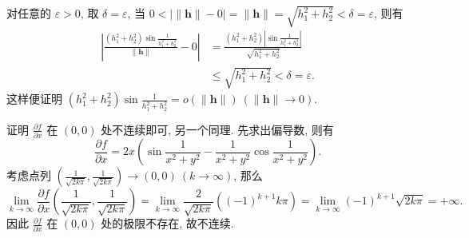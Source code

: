 \documentclass[a4paper, 11pt]{ctexart}
\begin{document}
\begin{enumerate}
        对任意的 $\varepsilon > 0$, 取 $\delta = \varepsilon$, 当 $0 < |\|\boldsymbol{h}\| - 0| = \|\boldsymbol{h}\| = \sqrt{h_1^2 + h_2^2} < \delta = \varepsilon$, 则有
        \begin{align*}
            \left| \frac{(h_1^2 + h_2^2)\sin\frac{1}{h_1^2 + h_2^2}}{\|\boldsymbol{h}\|} - 0 \right| &= \frac{(h_1^2 + h_2^2)|\sin\frac{1}{h_1^2 + h_2^2}|}{\sqrt{h_1^2 + h_2^2}} \\
            &\leqslant \sqrt{h_1^2 + h_2^2} < \delta = \varepsilon.    
        \end{align*}
        这样便证明 $(h_1^2 + h_2^2)\sin\frac{1}{h_1^2 + h_2^2} = o(\|\boldsymbol{h}\|)\ (\|\boldsymbol{h}\|\to0)$.

        证明 $\frac{\partial f}{\partial x}$ 在 $(0, 0)$ 处不连续即可, 另一个同理. 先求出偏导数, 则有
        \[
            \frac{\partial f}{\partial x} = 2x\left(\sin\frac{1}{x^2+y^2} - \frac{1}{x^2+y^2}\cos\frac{1}{x^2+y^2}\right).   
        \]
        考虑点列 $\displaystyle{\left(\frac{1}{\sqrt{2k\pi}}, \frac{1}{\sqrt{2k\pi}}\right) \to (0,0)\ (k\to\infty)}$, 那么
        \[
            \lim_{k\to\infty} \frac{\partial f}{\partial x}\left(\frac{1}{\sqrt{2k\pi}}, \frac{1}{\sqrt{2k\pi}}\right) = \lim_{k\to\infty}\frac{2}{\sqrt{2k\pi}}((-1)^{k+1}k\pi) = \lim_{k\to\infty}(-1)^{k+1}\sqrt{2k\pi} = +\infty.   
        \]
        因此 $\frac{\partial f}{\partial x}$ 在 $(0, 0)$ 处的极限不存在, 故不连续.
\end{enumerate}
\end{document}
